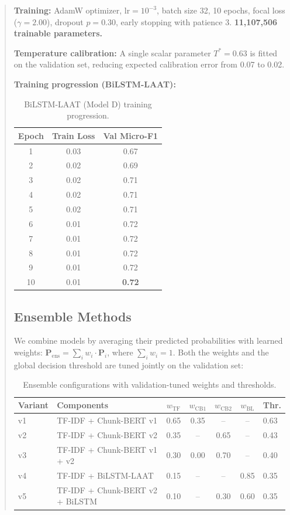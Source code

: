 \documentclass[11pt,a4paper]{article}
\begin{document}
\begin{abstract}
\textbf{Training:} AdamW optimizer, $\text{lr} = 10^{-3}$, batch size 32, 10 epochs, focal loss ($\gamma = 2.00$), dropout $p = 0.30$, early stopping with patience 3. \textbf{11,107,506 trainable parameters.}

\textbf{Temperature calibration:} A single scalar parameter $T^*= 0.63$ is fitted on the validation set, reducing expected calibration error from 0.07 to 0.02.

\textbf{Training progression (BiLSTM-LAAT):}

\begin{table}[H]
\centering
\caption{BiLSTM-LAAT (Model D) training progression.}
\label{tab:train_d}
\small
\begin{tabular}{ccc}
\toprule
\textbf{Epoch} & \textbf{Train Loss} & \textbf{Val Micro-F1} \\
\midrule
1  & 0.03 & 0.67 \\
2  & 0.02 & 0.69 \\
3  & 0.02 & 0.71 \\
4  & 0.02 & 0.71 \\
5  & 0.02 & 0.71 \\
6  & 0.01 & 0.72 \\
7  & 0.01 & 0.72 \\
8  & 0.01 & 0.72 \\
9  & 0.01 & 0.72 \\
10 & 0.01 & \textbf{0.72} \\
\bottomrule
\end{tabular}
\end{table}

\subsection{Ensemble Methods}

We combine models by averaging their predicted probabilities with learned weights: $\mathbf{P}_{\text{ens}} = \sum_i w_i \cdot \mathbf{P}_i$, where $\sum_i w_i = 1$. Both the weights and the global decision threshold are tuned jointly on the validation set:

\begin{table}[H]
\centering
\caption{Ensemble configurations with validation-tuned weights and thresholds.}
\label{tab:ensemble_weights}
\small
\begin{tabular}{llccccl}
\toprule
\textbf{Variant} & \textbf{Components} & $w_{\text{TF}}$ & $w_{\text{CB1}}$ & $w_{\text{CB2}}$ & $w_{\text{BL}}$ & \textbf{Thr.} \\
\midrule
v1 & TF-IDF + Chunk-BERT v1          & 0.65 & 0.35 & --  & --  & 0.63 \\
v2 & TF-IDF + Chunk-BERT v2          & 0.35 & --  & 0.65 & --  & 0.43 \\
v3 & TF-IDF + Chunk-BERT v1 + v2     & 0.30 & 0.00 & 0.70 & --  & 0.40 \\
\rowcolor{lightgray}
v4 & TF-IDF + BiLSTM-LAAT            & 0.15 & --  & --  & 0.85 & 0.35 \\
v5 & TF-IDF + Chunk-BERT v2 + BiLSTM & 0.10 & --  & 0.30 & 0.60 & 0.35 \\
\bottomrule
\end{tabular}


\end{table}
\end{abstract}
\end{document}
